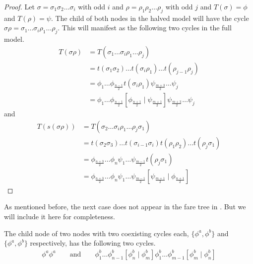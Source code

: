 \begin{proof}
	Let $\sigma = \sigma_1\sigma_2 \dots \sigma_i$ with odd $i$ and $\rho = \rho_1\rho_2 \dots \rho_j$ with odd $j$ and $T(\sigma) = \phi$ and $T(\rho) = \psi$.
	The child of both nodes in the halved model will have the cycle $\sigma\rho = \sigma_1 \dots \sigma_i \rho_1 \dots \rho_j$.
	This will manifest as the following two cycles in the full model.
	\begin{align*}
		T(\sigma\rho) & = T(\sigma_1 \dots \sigma_i \rho_1 \dots \rho_j)                                                                                  \\
		              & = t(\sigma_1\sigma_2) \dots t(\sigma_i\rho_1) \dots t(\rho_{j-1}\rho_j)                                                           \\
		              & = \phi_1 \dots \phi_{\frac{n-1}{2}} t(\sigma_i\rho_1) \psi_{\frac{m+3}{2}} \dots \psi_j                                           \\
		              & = \phi_1 \dots \phi_{\frac{n-1}{2}} \left[\phi_{\frac{n+1}{2}} \mid \psi_{\frac{m+1}{2}}\right] \psi_{\frac{m+3}{2}} \dots \psi_j
	\end{align*}
	and
	\begin{align*}
		T(s(\sigma\rho)) & = T(\sigma_2 \dots \sigma_i \rho_1 \dots \rho_j \sigma_1)                                                                         \\
		                 & = t(\sigma_2\sigma_3) \dots t(\sigma_{i-1}\sigma_i) t(\rho_1\rho_2) \dots t(\rho_j\sigma_1)                                       \\
		                 & = \phi_{\frac{n+3}{2}} \dots \phi_n \psi_1 \dots \psi_{\frac{m-1}{2}} t(\rho_j\sigma_1)                                           \\
		                 & = \phi_{\frac{n+3}{2}} \dots \phi_n \psi_1 \dots \psi_{\frac{m-1}{2}} \left[\psi_{\frac{m+1}{2}} \mid \phi_{\frac{n+1}{2}}\right]
	\end{align*}
\end{proof}


As mentioned before, the next case does not appear in the fare tree in .
But we will include it here for completeness.

\begin{theorem}
	The child node of two nodes with two coexisting cycles each, $\{\phi^a, \phi^b\}$ and $\{\phi^a, \phi^b\}$ respectively, has the following two cycles.
	\begin{align*}
		\phi^a\phi^a \qquad \text{and} \qquad
		\phi^b_1 \dots \phi^b_{n-1} \left[\phi^b_n \mid \phi^b_m\right] \phi^b_1 \dots \phi^b_{m-1} \left[\phi^b_m \mid \phi^b_n\right]
	\end{align*}
\end{theorem}

